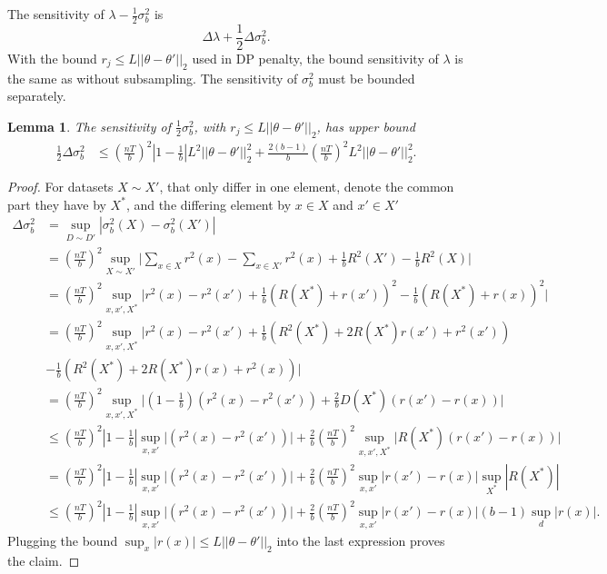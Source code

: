 \documentclass[english,twoside,openright]{HYgraduMLDS}
\newtheorem{lemma}{Lemma}
\begin{document}
The sensitivity of \(\lambda - \frac{1}{2}\sigma_b^2\) is 
\[
    \Delta \lambda + \frac{1}{2}\Delta \sigma_b^2.
\]
With the bound \(r_j \leq L||\theta - \theta'||_2\) used in DP penalty, the 
bound sensitivity of \(\lambda\) is the same as without subsampling.
The sensitivity of \(\sigma_b^2\) must be bounded separately.
\begin{lemma}\label{variance_sensitivity_lemma}
    The sensitivity of \(\frac{1}{2}\sigma_b^2\), 
    with \(r_j \leq L||\theta - \theta'||_2\), has upper bound
    \begin{align*}
        \frac{1}{2}\Delta \sigma_b^2
        &\leq \left(\frac{nT}{b}\right)^2 \left|1 - \frac{1}{b}\right|
        L^2||\theta - \theta'||_2^2
        + \frac{2(b - 1)}{b}\left(\frac{nT}{b}\right)^2 L^2||\theta - \theta'||^2_2.
    \end{align*}
\end{lemma}
\begin{proof}
    For datasets \(X \sim X'\), that only differ in one element, denote the 
    common part they have by \(X^*\), and the differing element by \(x\in X\) 
    and \(x'\in X'\)
    \begin{align*}
        \Delta \sigma^2_b &= \sup_{D\sim D'} |\sigma^2_b(X) - \sigma^2_b(X')|
        \\&= \left(\frac{nT}{b}\right)^2 \sup_{X\sim X'}\Big|
        \sum_{x\in X}r^2(x) - \sum_{x\in X'}r^2(x)
        + \frac{1}{b}R^2(X') - \frac{1}{b}R^2(X)\Big|
        \\&= \left(\frac{nT}{b}\right)^2 \sup_{x, x', X^*}\Big|
        r^2(x) - r^2(x')
        + \frac{1}{b}(R(X^*) + r(x'))^2 - \frac{1}{b}(R(X^*) + r(x))^2\Big|
        \\&= \left(\frac{nT}{b}\right)^2 \sup_{x, x', X^*}\Big|
        r^2(x) - r^2(x')
        + \frac{1}{b}(R^2(X^*) + 2R(X^*)r(x') + r^2(x'))
        \\&- \frac{1}{b}(R^2(X^*) + 2R(X^*)r(x) + r^2(x))\Big|
        \\&= \left(\frac{nT}{b}\right)^2 \sup_{x, x', X^*}\Big|
        \left(1 - \frac{1}{b}\right)(r^2(x) - r^2(x'))
        + \frac{2}{b}D(X^*)(r(x') - r(x))\Bigg|
        \\&\leq \left(\frac{nT}{b}\right)^2 \left|1 - \frac{1}{b}\right|
        \sup_{x, x'}\Big|(r^2(x) - r^2(x'))\Big|
        + \frac{2}{b}\left(\frac{nT}{b}\right)^2 \sup_{x, x', X^*}\Big|
        R(X^*)(r(x') - r(x))\Bigg|
        \\&= \left(\frac{nT}{b}\right)^2 \left|1 - \frac{1}{b}\right|
        \sup_{x, x'}\Big|(r^2(x) - r^2(x'))\Big|
        + \frac{2}{b}\left(\frac{nT}{b}\right)^2
        \sup_{x, x'}|r(x') - r(x)|
        \sup_{X^*}|R(X^*)|
        \\&\leq \left(\frac{nT}{b}\right)^2 \left|1 - \frac{1}{b}\right|
        \sup_{x, x'}\Big|(r^2(x) - r^2(x'))\Big|
        + \frac{2}{b}\left(\frac{nT}{b}\right)^2
        \sup_{x, x'}|r(x') - r(x)|(b - 1)\sup_{d}|r(x)|.
    \end{align*}
    Plugging the bound \(\sup_x |r(x)| \leq L||\theta - \theta'||_2\) 
    into the last expression proves the claim.
\end{proof}
\end{document}
